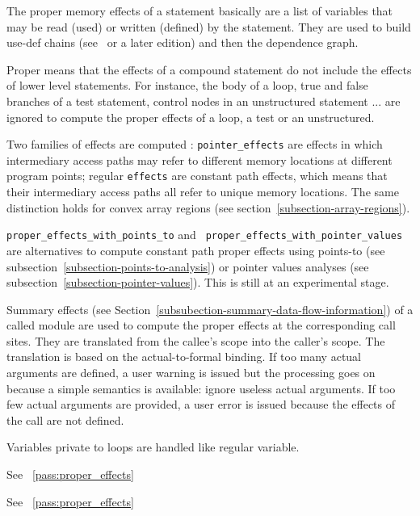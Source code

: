 \documentclass[a4paper]{report}
\newcommand{\PipsPassRef}[1]{\texttt{\detokenize{#1}}~\ref{pass:#1}}
\newenvironment{PipsPass}[1]{\label{pass:#1}}{}
\begin{document}
\begin{PipsPass}{proper_effects}
The proper memory effects of a statement basically are a list of variables
that may be read (used) or written (defined) by the statement. They are used to build use-def
chains (see~\cite{ASU86} or a later edition) and then the dependence graph.

Proper means that the effects of a compound statement do not include the
effects of lower level statements. For instance, the body of a loop, true and
false branches of a test statement, control nodes in an unstructured
statement ... are ignored to compute the proper effects of a loop, a
test or an unstructured.

Two families of effects are computed : {\tt pointer\_effects} are
effects in which intermediary access paths may refer to different
memory locations at different program points; regular {\tt effects}
are constant path effects, which means that their intermediary access
paths all refer to unique memory locations. The same distinction holds
for convex array regions (see section~\ref{subsection-array-regions}).

{\tt proper\_effects\_with\_points\_to} and {\tt
  proper\_effects\_with\_pointer\_values} are alternatives to compute
constant path proper effects using points-to (see
subsection~\ref{subsection-points-to-analysis}) or pointer values
analyses (see subsection~\ref{subsection-pointer-values}). This is
still at an experimental stage.

Summary effects (see
Section~\ref{subsubection-summary-data-flow-information}) of a called
module are used to compute the proper effects at the corresponding
call sites. They are translated from the callee's scope into the
caller's scope. The translation is based on the actual-to-formal
binding. If too many actual arguments are defined, a user warning is
issued but the processing goes on because a simple semantics is
available: ignore useless actual arguments. If too few actual
arguments are provided, a user error is issued because the effects of
the call are not defined.

Variables private to loops are handled like regular variable.
\end{PipsPass}


\begin{PipsPass}{proper_pointer_effects}
 See \PipsPassRef{proper_effects}
\end{PipsPass}

\begin{PipsPass}{proper_effects_with_points_to}
 See \PipsPassRef{proper_effects}
\end{PipsPass}
\end{document}
